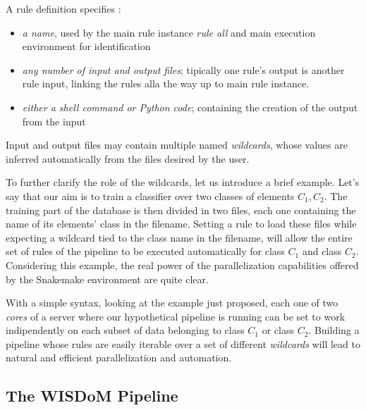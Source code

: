 \documentclass[12pt,openright,twoside,a4paper]{book}
\begin{document}
A rule definition specifies :

\begin{itemize}
\item \textit{a name}, used by the main rule instance \textit{rule all} and main execution environment for identification
\item \textit{any number of input and output files}; tipically one rule's output is another rule input, linking the rules alla the way up to main rule instance.
\item  \textit{either a shell command or Python code}; containing the creation of the output from the input
\end{itemize} 
Input and output files may contain multiple named \textit{wildcards}, whose values are inferred automatically from the files desired by the user.

To further clarify the role of the wildcards, let us introduce a brief example.
Let's say that our aim is to train a classifier over two classes of elements $C_1,C_2$. The training part of the database is then divided in two files, each one containing the name of its elements' class in the filename.
Setting a rule to load these files while expecting a wildcard tied to the class name in the filename, will allow the entire set of rules of the pipeline to be executed automatically for class $C_1$ and class $C_2$.
Considering this example, the real power of the parallelization capabilities offered by the Snakemake environment are quite clear.

With a simple syntax, looking at the example just proposed, each one of two \textit{cores} of a server where our hypothetical pipeline is running can be set to work indipendently on each subset of data belonging to class $C_1$ or class $C_2$.
Building a pipeline whose rules are easily iterable over a set of different \textit{wildcards} will lead to natural and efficient parallelization and automation.
\clearpage
\subsection{The WISDoM Pipeline}
\end{document}
